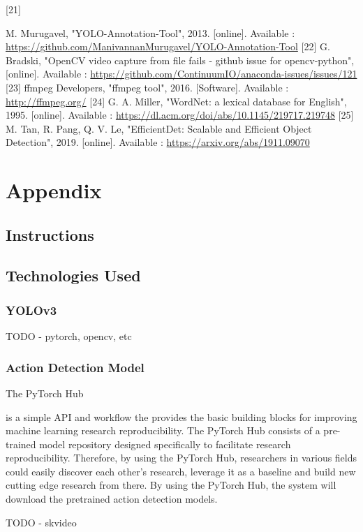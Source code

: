 \documentclass{article}
\begin{document}
\newline
\hypertarget{ref21}{[21]} M. Murugavel, "YOLO-Annotation-Tool", 2013. [online]. Available :  \url{https://github.com/ManivannanMurugavel/YOLO-Annotation-Tool}
\newline
\hypertarget{ref22}{[22]} G. Bradski, "OpenCV video capture from file fails - github issue for opencv-python", [online]. Available : \url{https://github.com/ContinuumIO/anaconda-issues/issues/121}
\newline
\hypertarget{ref23}{[23]} ffmpeg Developers, "ffmpeg tool", 2016. [Software]. Available : \url{http://ffmpeg.org/}
\newline
\hypertarget{ref24}{[24]} G. A. Miller, "WordNet: a lexical database for English", 1995. [online]. Available : \url{https://dl.acm.org/doi/abs/10.1145/219717.219748}
\newline
\hypertarget{ref25}{[25]} M. Tan, R. Pang, Q. V. Le, "EfficientDet: Scalable and Efficient Object Detection", 2019. [online]. Available : \url{https://arxiv.org/abs/1911.09070}
\newline

\newpage

\section{Appendix}

\subsection{Instructions}

\subsection{Technologies Used}

\subsubsection{YOLOv3}

TODO - pytorch, opencv, etc

\subsubsection{Action Detection Model}

\hypertarget{actionDetection_used}{The PyTorch Hub} is a simple API and workflow the provides the basic building blocks for improving machine learning research reproducibility. The PyTorch Hub consists of a pre-trained model repository designed specifically to facilitate research reproducibility.  Therefore, by using the PyTorch Hub, researchers in various fields could easily discover each other’s research, leverage it as a baseline and build new cutting edge research from there. By using the PyTorch Hub, the system will download the pretrained action detection models.

TODO - skvideo
\end{document}
